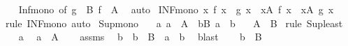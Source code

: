 \begin{isabellebody}
%
\isadelimproof
\ \ %
\endisadelimproof
%
\isatagproof
{}\isamarkupfalse%
\ Inf{\isacharunderscore}{\kern0pt}mono\ {\isacharbrackleft}{\kern0pt}of\ {\isachardoublequoteopen}g\ {\isacharbackquote}{\kern0pt}\ B{\isachardoublequoteclose}\ {\isachardoublequoteopen}f\ {\isacharbackquote}{\kern0pt}\ A{\isachardoublequoteclose}{\isacharbrackright}{\kern0pt}\ \isamarkupfalse%
\ auto%
\endisatagproof
{\isafoldproof}%
%
\isadelimproof
\isanewline
%
\endisadelimproof
\isanewline
{}\isamarkupfalse%
\ INF{\isacharunderscore}{\kern0pt}mono{\isacharprime}{\kern0pt}{\isacharcolon}{\kern0pt}\ {\isachardoublequoteopen}{\isacharparenleft}{\kern0pt}{\isasymAnd}x{\isachardot}{\kern0pt}\ f\ x\ {\isasymle}\ g\ x{\isacharparenright}{\kern0pt}\ {\isasymLongrightarrow}\ {\isacharparenleft}{\kern0pt}{\isasymSqinter}x{\isasymin}A{\isachardot}{\kern0pt}\ f\ x{\isacharparenright}{\kern0pt}\ {\isasymle}\ {\isacharparenleft}{\kern0pt}{\isasymSqinter}x{\isasymin}A{\isachardot}{\kern0pt}\ g\ x{\isacharparenright}{\kern0pt}{\isachardoublequoteclose}\isanewline
%
\isadelimproof
\ \ %
\endisadelimproof
%
\isatagproof
{}\isamarkupfalse%
\ {\isacharparenleft}{\kern0pt}rule\ INF{\isacharunderscore}{\kern0pt}mono{\isacharparenright}{\kern0pt}\ auto%
\endisatagproof
{\isafoldproof}%
%
\isadelimproof
\isanewline
%
\endisadelimproof
\isanewline
{}\isamarkupfalse%
\ Sup{\isacharunderscore}{\kern0pt}mono{\isacharcolon}{\kern0pt}\isanewline
\ \ \ {\isachardoublequoteopen}{\isasymAnd}a{\isachardot}{\kern0pt}\ a\ {\isasymin}\ A\ {\isasymLongrightarrow}\ {\isasymexists}b{\isasymin}B{\isachardot}{\kern0pt}\ a\ {\isasymle}\ b{\isachardoublequoteclose}\isanewline
\ \ \ {\isachardoublequoteopen}{\isasymSqunion}A\ {\isasymle}\ {\isasymSqunion}B{\isachardoublequoteclose}\isanewline
%
\isadelimproof
%
\endisadelimproof
%
\isatagproof
{}\isamarkupfalse%
\ {\isacharparenleft}{\kern0pt}rule\ Sup{\isacharunderscore}{\kern0pt}least{\isacharparenright}{\kern0pt}\isanewline
\ \ \isamarkupfalse%
\ a\ \isamarkupfalse%
\ {\isachardoublequoteopen}a\ {\isasymin}\ A{\isachardoublequoteclose}\isanewline
\ \ \isamarkupfalse%
\ assms\ \isamarkupfalse%
\ b\ \ {\isachardoublequoteopen}b\ {\isasymin}\ B{\isachardoublequoteclose}\ \ {\isachardoublequoteopen}a\ {\isasymle}\ b{\isachardoublequoteclose}\ \isamarkupfalse%
\ blast\isanewline
\ \ \isamarkupfalse%
\ {\isacartoucheopen}b\ {\isasymin}\ B{\isacartoucheclose}\ \isamarkupfalse%

\end{isabellebody}
